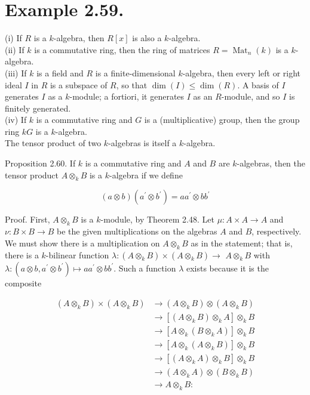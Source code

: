 \documentclass[10pt]{article}
\begin{document}
\section*{Example 2.59.}
(i) If $R$ is a $k$-algebra, then $R[x]$ is also a $k$-algebra.\\
(ii) If $k$ is a commutative ring, then the ring of matrices $R=\operatorname{Mat}_{n}(k)$ is a $k$-algebra.\\
(iii) If $k$ is a field and $R$ is a finite-dimensional $k$-algebra, then every left or right ideal $I$ in $R$ is a subspace of $R$, so that $\operatorname{dim}(I) \leq \operatorname{dim}(R)$. A basis of $I$ generates $I$ as a $k$-module; a fortiori, it generates $I$ as an $R$-module, and so $I$ is finitely generated.\\
(iv) If $k$ is a commutative ring and $G$ is a (multiplicative) group, then the group ring $k G$ is a $k$-algebra.\\
The tensor product of two $k$-algebras is itself a $k$-algebra.

Proposition 2.60. If $k$ is a commutative ring and $A$ and $B$ are $k$-algebras, then the tensor product $A \otimes_{k} B$ is a $k$-algebra if we define

$$
(a \otimes b)\left(a^{\prime} \otimes b^{\prime}\right)=a a^{\prime} \otimes b b^{\prime}
$$

Proof. First, $A \otimes_{k} B$ is a $k$-module, by Theorem 2.48. Let $\mu: A \times A \rightarrow A$ and $\nu: B \times B \rightarrow B$ be the given multiplications on the algebras $A$ and $B$, respectively. We must show there is a multiplication on $A \otimes_{k} B$ as in the statement; that is, there is a $k$-bilinear function $\lambda:\left(A \otimes_{k} B\right) \times\left(A \otimes_{k} B\right) \rightarrow$ $A \otimes_{k} B$ with $\lambda:\left(a \otimes b, a^{\prime} \otimes b^{\prime}\right) \mapsto a a^{\prime} \otimes b b^{\prime}$. Such a function $\lambda$ exists because it is the composite

$$
\begin{aligned}
\left(A \otimes_{k} B\right) \times\left(A \otimes_{k} B\right) & \rightarrow\left(A \otimes_{k} B\right) \otimes\left(A \otimes_{k} B\right) \\
& \rightarrow\left[\left(A \otimes_{k} B\right) \otimes_{k} A\right] \otimes_{k} B \\
& \rightarrow\left[A \otimes_{k}\left(B \otimes_{k} A\right)\right] \otimes_{k} B \\
& \rightarrow\left[A \otimes_{k}\left(A \otimes_{k} B\right)\right] \otimes_{k} B \\
& \rightarrow\left[\left(A \otimes_{k} A\right) \otimes_{k} B\right] \otimes_{k} B \\
& \rightarrow\left(A \otimes_{k} A\right) \otimes\left(B \otimes_{k} B\right) \\
& \rightarrow A \otimes_{k} B:
\end{aligned}
$$
\end{document}
